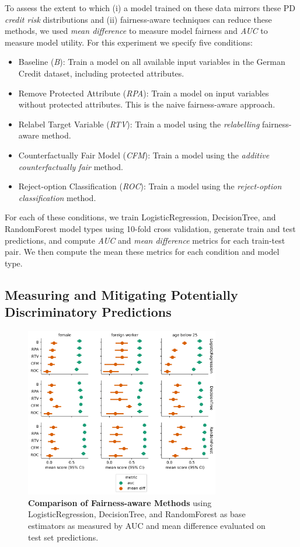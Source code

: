 \documentclass{acm_proc_article-sp}
\begin{document}
To assess the extent to which (i) a model trained on these data mirrors these PD
\emph{credit risk} distributions and (ii) fairness-aware techniques can reduce
these methods, we used \emph{mean difference} to measure model fairness and
\emph{AUC} to measure model utility. For this experiment we specify five
conditions:

\begin{itemize}
  \item Baseline (\emph{B}): Train a model on all available input variables in
        the German Credit dataset, including protected attributes.
  \item Remove Protected Attribute (\emph{RPA}): Train a model on input variables
        without protected attributes. This is the naive fairness-aware approach.
  \item Relabel Target Variable (\emph{RTV}): Train a model using the
        \emph{relabelling} fairness-aware method.
  \item Counterfactually Fair Model (\emph{CFM}): Train a model using the
        \emph{additive counterfactually fair} method.
  \item Reject-option Classification (\emph{ROC}): Train a model using the
        \emph{reject-option classification} method.
\end{itemize}

For each of these conditions, we train LogisticRegression, DecisionTree, and
RandomForest model types using 10-fold cross validation, generate train and test
predictions, and compute \emph{AUC} and \emph{mean difference} metrics for each
train-test pair. We then compute the mean these metrics for each condition and
model type.

\subsection{Measuring and Mitigating Potentially Discriminatory Predictions}

\begin{figure}[h]
\centering
\includegraphics[width=8.5cm]{IMG/fairness_aware_comparison.png}
\caption{
  \textbf{Comparison of Fairness-aware Methods} using LogisticRegression,
  DecisionTree, and RandomForest as base estimators as measured by AUC and
  mean difference evaluated on test set predictions.}
\label{figure-1-comparison-fa-methods}
\end{figure}
\end{document}
